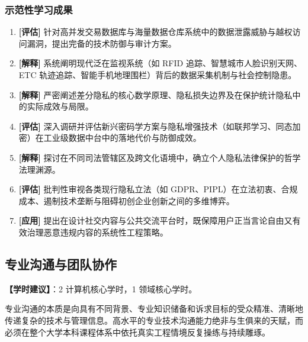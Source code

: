 \subsubsection{示范性学习成果}
\begin{enumerate}
    \item \textbf{[评估]} 针对高并发交易数据库与海量数据仓库系统中的数据泄露威胁与越权访问漏洞，提出完备的技术防御与审计方案。
    \item \textbf{[解释]} 系统阐明现代泛在监视系统（如 RFID 追踪、智慧城市人脸识别天网、ETC 轨迹追踪、智能手机地理围栏）背后的数据采集机制与社会控制隐患。
    \item \textbf{[解释]} 严密阐述差分隐私的核心数学原理、隐私损失边界及在保护统计隐私中的实际成效与局限。
    \item \textbf{[评估]} 深入调研并评估新兴密码学方案与隐私增强技术（如联邦学习、同态加密）在工业级数据中台中的落地代价与防御成效。
    \item \textbf{[解释]} 探讨在不同司法管辖区及跨文化语境中，确立个人隐私法律保护的哲学法理渊源。
    \item \textbf{[评估]} 批判性审视各类现行隐私立法（如 GDPR、PIPL）在立法初衷、合规成本、遏制技术垄断与阻碍初创企业创新之间的多维博弈。
    \item \textbf{[应用]} 提出在设计社交内容与公共交流平台时，既保障用户正当言论自由又有效治理恶意违规内容的系统性工程策略。
\end{enumerate}

\subsection{专业沟通与团队协作}
\textbf{【学时建议】}：2 计算机核心学时，1 领域核心学时。

专业沟通的本质是向具有不同背景、专业知识储备和诉求目标的受众精准、清晰地传递复杂的技术与管理信息。高水平的专业技术沟通能力绝非与生俱来的天赋，而必须在整个大学本科课程体系中依托真实工程情境反复操练与持续雕琢。

